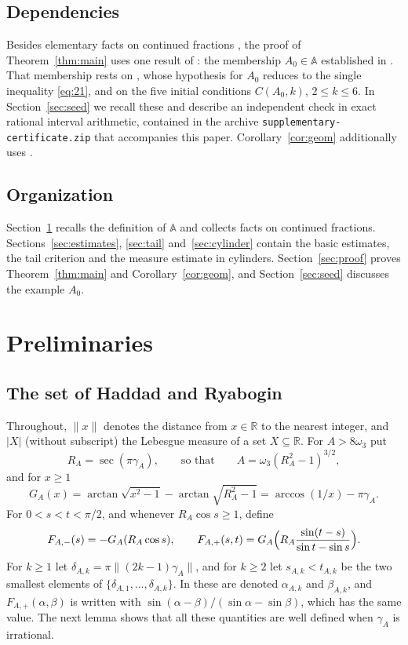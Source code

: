 \documentclass{amsart}
\theoremstyle{definition}
\theoremstyle{remark}
\numberwithin{equation}{section}
\newcommand{\R}{\mathbb{R}}
\newcommand{\AAA}{\mathbb{A}}
\newcommand{\norm}[1]{\lVert #1 \rVert}
\newcommand{\meas}[1]{\lvert #1 \rvert}
\begin{document}
\subsection*{Dependencies}
Besides elementary facts on continued fractions \cite{Kh}, the proof of Theorem~\ref{thm:main} uses one result of \cite{HR}: the membership $A_0\in\AAA$ established in \cite[Section~4.2]{HR}. That membership rests on \cite[Theorem~14(a)]{HR}, whose hypothesis for $A_0$ reduces to the single inequality \eqref{eq:21}, and on the five initial conditions $C(A_0,k)$, $2\le k\le6$. In Section~\ref{sec:seed} we recall these and describe an independent check in exact rational interval arithmetic, contained in the archive \texttt{supplementary-certificate.zip} that accompanies this paper. Corollary~\ref{cor:geom} additionally uses \cite[Theorem~9]{HR}.

\subsection*{Organization}
Section~\ref{sec:prelim} recalls the definition of $\AAA$ and collects facts on continued fractions. Sections~\ref{sec:estimates}, \ref{sec:tail} and~\ref{sec:cylinder} contain the basic estimates, the tail criterion and the measure estimate in cylinders. Section~\ref{sec:proof} proves Theorem~\ref{thm:main} and Corollary~\ref{cor:geom}, and Section~\ref{sec:seed} discusses the example $A_0$.

\section{Preliminaries}\label{sec:prelim}

\subsection{The set of Haddad and Ryabogin}
Throughout, $\norm{x}$ denotes the distance from $x\in\R$ to the nearest integer, and $\meas{X}$ (without subscript) the Lebesgue measure of a set $X\subseteq\R$. For $A>8\omega_3$ put
\[
R_A=\sec(\pi\gamma_A),\qquad\text{so that}\qquad A=\omega_3(R_A^2-1)^{3/2},
\]
and for $x\ge1$
\[
G_A(x)=\arctan\sqrt{x^2-1}-\arctan\sqrt{R_A^2-1}=\arccos(1/x)-\pi\gamma_A .
\]
For $0<s<t<\pi/2$, and whenever $R_A\cos s\ge1$, define
\[
F_{A,-}(s)=-G_A(R_A\cos s),\qquad
F_{A,+}(s,t)=G_A\Bigl(R_A\frac{\sin(t-s)}{\sin t-\sin s}\Bigr).
\]
For $k\ge1$ let $\delta_{A,k}=\pi\norm{(2k-1)\gamma_A}$, and for $k\ge2$ let $s_{A,k}<t_{A,k}$ be the two smallest elements of $\{\delta_{A,1},\dots,\delta_{A,k}\}$. In \cite{HR} these are denoted $\alpha_{A,k}$ and $\beta_{A,k}$, and $F_{A,+}(\alpha,\beta)$ is written with $\sin(\alpha-\beta)/(\sin\alpha-\sin\beta)$, which has the same value. The next lemma shows that all these quantities are well defined when $\gamma_A$ is irrational.
\end{document}
